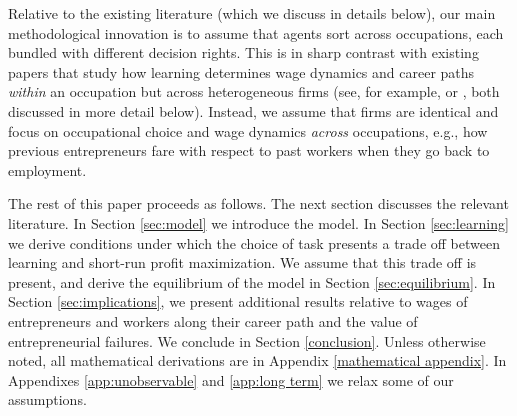 \documentclass[12pt,american]{paper}
\theoremstyle{remark}
\begin{document}

Relative to the existing literature (which we discuss in details below), our main methodological innovation is to assume that agents sort across occupations, each bundled with different decision rights. This is in sharp contrast with existing papers that study how learning determines wage dynamics and career paths \textit{within} an occupation but across heterogeneous firms (see, for example, \citealp{papageorgiou_learning_2010} or \citealp{pastorino2013careers}, both discussed in more detail below). Instead, we assume that firms are identical and focus on occupational choice and wage dynamics \textit{across} occupations, e.g., how previous entrepreneurs fare with respect to past workers when they go back to employment.

The rest of this paper proceeds as follows. The next section discusses the relevant literature.
In Section \ref{sec:model} we introduce the model. In Section \ref{sec:learning} we derive conditions under which the choice of task presents a trade off between learning and short-run profit maximization. We assume that this trade off is present, and derive the equilibrium of the model in Section \ref{sec:equilibrium}.  In Section \ref{sec:implications}, we present additional results relative to wages of entrepreneurs and workers along their career path and the value of entrepreneurial failures. We conclude in Section \ref{conclusion}. Unless otherwise noted, all mathematical derivations are in Appendix \ref{mathematical appendix}. In  Appendixes \ref{app:unobservable} and \ref{app:long term} we relax some of our assumptions. 
\end{document}
